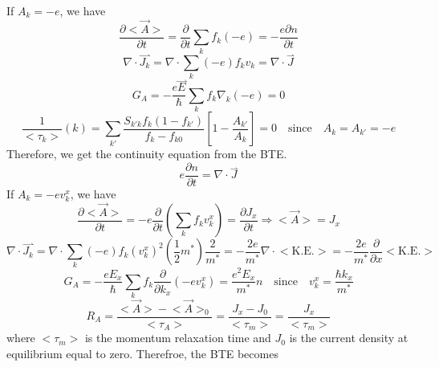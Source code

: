 If $\boxed{A_{k} = -e}$, we have \begin{equation}
    \frac{\partial \big<\vec{A}\big>}{\partial t} = \frac{\partial}{\partial t}\sum_{k}{f_{k}(-e)} = -\frac{e\partial n}{\partial t}
\end{equation} \begin{equation}
    \nabla\cdot\overset{\rightharpoonup}{J_{k}} = \nabla\cdot\sum_{k}{(-e)f_{k}v_{k}} = \nabla\cdot\overset{\rightharpoonup}{J}
\end{equation} \begin{equation}
    G_{A} = -\frac{e\overset{\rightharpoonup}{E}}{\hbar}\sum_{k}f_{k}\nabla_{k}(-e) = 0
\end{equation} \begin{equation}
    \frac{1}{\big<\tau_{k}\big>}(k) = \sum_{k'}{\frac{S_{k'k}f_{k}(1-f_{k'})}{f_{k}-f_{k0}}\left[1-\frac{A_{k'}}{A_{k}}\right]} = 0\quad \text{since} \quad A_{k} = A_{k'} = -e
\end{equation} Therefore, we get the continuity equation from the BTE. \begin{equation}
    \boxed{e\frac{\partial n}{\partial t} = \nabla\cdot\overset{\rightharpoonup}{J}}
\end{equation}If $\boxed{A_{k} = -ev^{x}_{k}}$, we have \begin{equation}
    \frac{\partial \big<\vec{A}\big>}{\partial t} = -e\frac{\partial}{\partial t}\left(\sum_{k}{f_{k}v_{k}^{x}}\right) = \frac{\partial J_{x}}{\partial t}\Rightarrow\big<\vec{A}\big> = J_{x}
\end{equation} \begin{equation}
    \nabla\cdot\overset{\rightharpoonup}{J_{k}} = \nabla\cdot\sum_{k}{(-e)f_{k}(v_{k}^{x})^{2}}\left(\frac{1}{2}m^{*}\right)\frac{2}{m^{*}} = -\frac{2e}{m^{*}}\nabla\cdot\big<\text{K.E.}\big> = -\frac{2e}{m^{*}}\frac{\partial}{\partial x}\big<\text{K.E.}\big>
\end{equation} \begin{equation}
    G_{A} =  -\frac{eE_{x}}{\hbar}\sum_{k}f_{k}\frac{\partial}{\partial k_{x}}(-ev_{k}^{x}) = \frac{e^{2}E_{x}}{m^{*}}n\quad \text{since} \quad v_{k}^{x} = \frac{\hbar k_{x}}{m^{*}}
\end{equation} \begin{equation}
    R_{A} = \frac{\big<\vec{A}\big>-\big<\vec{A}\big>_{0}}{\big<\tau_{A}\big>} = \frac{J_{x}-J_{0}}{\big<\tau_{m}\big>} = \frac{J_{x}}{\big<\tau_{m}\big>}
\end{equation} where $\big<\tau_{m}\big>$ is the momentum relaxation time and $J_{0}$ is the current density at equilibrium equal to zero. Therefroe, the BTE becomes \begin{equation}

\end{equation}
